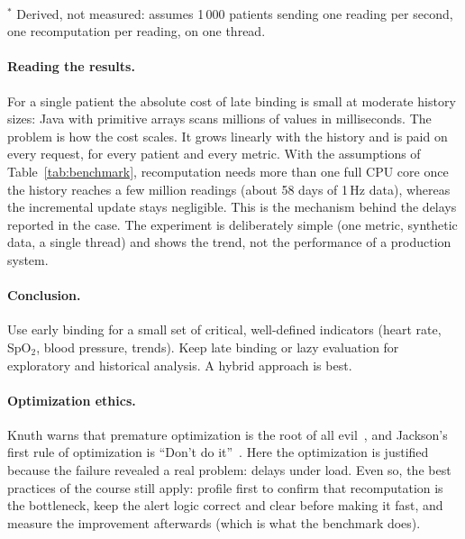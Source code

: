 \documentclass[11pt,a4paper]{article}
\begin{document}
\begin{table}[H]
\centering
\caption{Measured results.}\label{tab:benchmark}
{\small\setlength{\tabcolsep}{4pt}}\\[3pt]
{\footnotesize $^{*}$ Derived, not measured: assumes 1\,000 patients sending one reading per second, one recomputation per reading, on one thread.}
\end{table}

\paragraph{Reading the results.} For a single patient the absolute cost of late binding is small at moderate history sizes: Java with primitive arrays scans millions of values in milliseconds. The problem is how the cost scales. It grows linearly with the history and is paid on every request, for every patient and every metric. With the assumptions of Table~\ref{tab:benchmark}, recomputation needs more than one full CPU core once the history reaches a few million readings (about 58 days of 1\,Hz data), whereas the incremental update stays negligible. This is the mechanism behind the delays reported in the case. The experiment is deliberately simple (one metric, synthetic data, a single thread) and shows the trend, not the performance of a production system.

\paragraph{Conclusion.} Use early binding for a small set of critical, well-defined indicators (heart rate, SpO$_2$, blood pressure, trends). Keep late binding or lazy evaluation for exploratory and historical analysis. A hybrid approach is best.

\paragraph{Optimization ethics.} Knuth warns that premature optimization is the root of all evil~\cite{knuth1974}, and Jackson's first rule of optimization is ``Don't do it''~\cite{jackson1975}. Here the optimization is justified because the failure revealed a real problem: delays under load. Even so, the best practices of the course still apply: profile first to confirm that recomputation is the bottleneck, keep the alert logic correct and clear before making it fast, and measure the improvement afterwards (which is what the benchmark does).
\end{document}
